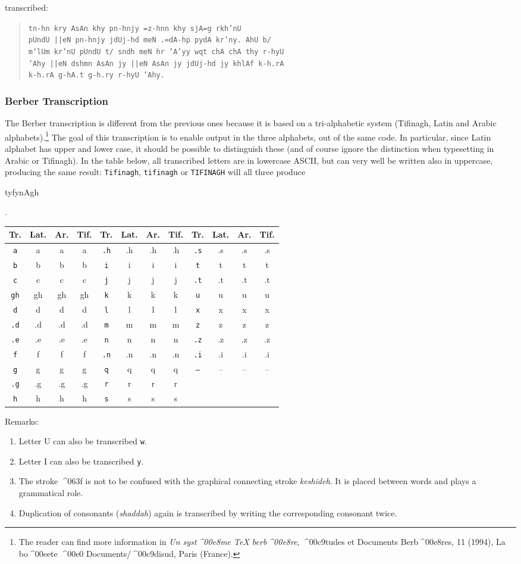 \documentclass[a4paper,11pt]{article}
\def\shortarab#1{{\pushocplist\ArabicOCP\fontfamily{omarb}\selectfont#1\popocplist}}
\def\shortberber#1{{\pushocplist\ArabicBerberOCP\fontfamily{omarb}\selectfont#1\popocplist}}
\def\shortlatberber#1{{\pushocplist\LatinBerberOCP\fontfamily{omlgc}\selectfont#1\popocplist}}
\def\shorttifi#1{{\pushocplist\TifinaghOCP\fontfamily{omlgc}\selectfont#1\popocplist}}
\def\ttl#1#2#3{\hline\rule[-5pt]{0pt}{14pt}\texttt{#1}&\shortlatberber{#1}&\shortberber{#1}&\shorttifi{#1}&
\texttt{#2}&\shortlatberber{#2}&\shortberber{#2}&\shorttifi{#2}&
\texttt{#3}&\shortlatberber{#3}&\shortberber{#3}&\shorttifi{#3}\\}
\begin{document}
\noindent
transcribed:

\begin{quote}
\texttt{tn-hn kry AsAn khy pn-hnjy =z-hnn khy sjA=g rkh'nU\\
pUndU ||eN pn-hnjy jdUj-hd meN .=dA-hp pydA kr'ny. AhU b/\\
m`lUm kr'nU pUndU t/ sndh meN hr 'A'yy wqt chA chA thy r-hyU\\
'Ahy ||eN dshmn AsAn jy ||eN AsAn jy jdUj-hd jy khlAf k-h.rA\\
k-h.rA g-hA.t g-h.ry r-hyU 'Ahy.}
\end{quote}

\subsubsection{Berber Transcription}

The Berber transcription is different from the previous ones because
it is based on a tri-alphabetic system (Tifinagh, Latin and Arabic
alphabets).\footnote{The reader can find more information in \emph{Un
syst^^^^00e8me \TeX{} berb^^^^00e8re}, ^^^^00c9tudes et Documents
Berb^^^^00e8res, 11 (1994), La bo^^^^00eete ^^^^00e0
Documents/^^^^00c9disud, Paris (France).} The goal of this
transcription is to enable output in the three alphabets, out of the
same code. In particular, since Latin alphabet has upper and lower
case, it should be possible to distinguish these (and of course ignore
the distinction when typesetting in Arabic or Tifinagh). In the table
below, all transcribed letters are in lowercase ASCII, but can very
well be written also in uppercase, producing the same result:
\texttt{Tifinagh}, \texttt{tifinagh} or \texttt{TIFINAGH} will all
three produce \begin{arab}tyfynAgh\end{arab}.

\begin{center}
\begin{tabular}{|c|c|c|c||c|c|c|c||c|c|c|c|}\hline
Tr. & Lat. & Ar. & Tif. & Tr. & Lat. & Ar. & Tif. & Tr. & Lat. & Ar. & Tif. \\\hline
\ttl{a}{.h}{.s}
\ttl{b}{i}{t}
\ttl{c}{j}{.t}
\ttl{gh}{k}{u}
\ttl{d}{l}{x}
\ttl{.d}{m}{z}
\ttl{.e}{n}{.z}
\ttl{f}{.n}{.i}
\ttl{g}{q}{--}
\ttl{.g}{r}{}
\ttl{h}{s}{}
\hline
\end{tabular}
\end{center}

\noindent
Remarks:

\begin{enumerate}
\item Letter \shortarab{U} can also be transcribed \texttt{w}.
\item Letter \shortarab{I} can also be transcribed \texttt{y}.
\item The stroke \shortberber{^^^^063f} is not to be confused with the
graphical connecting stroke \emph{keshideh}.  It is placed between
words and plays a grammatical role.
\item Duplication of consonants (\emph{shaddah}) again is transcribed
by writing the corresponding consonant twice.
\end{enumerate}
\end{document}
